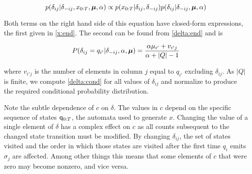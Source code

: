 \begin{equation}
p(\delta_{ij}|\delta_{-ij},x_{0:T},\bmu,\alpha) \propto p(x_{0:T}|\delta_{ij},\delta_{-ij})p(\delta_{ij}|\delta_{-ij},\bmu,\alpha) \label{delta:cond}
\end{equation}

Both terms on the right hand side of this equation have closed-form expressions, the first given in \eqref{x:end}.  The second can be found from \eqref{delta:end} and is

\begin{equation}
P(\delta_{ij} = q_{i'}|\delta_{-ij},\alpha,\bmu) = \frac{\alpha\mu_{i'} + v_{i'j}}{\alpha + |Q| - 1} \label{delta:pred}
\end{equation}

where $v_{i'j}$ is the number of elements in column $j$ equal to $q_{i'}$  excluding $\delta_{ij}$.  As $|Q|$ is finite, we compute \eqref{delta:cond} for all values of $\delta_{ij}$ and normalize to produce the required conditional probability distribution.

Note the subtle dependence of $c$ on $\delta$.  The values in $c$ depend on the specific sequence of states  $\q_{0:T}$, the automata used to generate $x$.  Changing the value of a single element of $\delta$ has a complex effect on $c$ as all counts subsequent to the changed state transition must be modified.  By changing $\delta_{ij}$, the set of states visited and the order in which those states are visited after the first time $q_i$ emits $\sigma_j$ are affected.  Among other things this means that some elements of $c$ that were zero may become nonzero, and vice versa.

